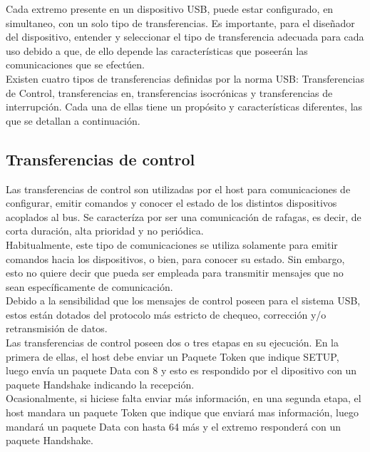 Cada extremo presente en un dispositivo USB, puede estar configurado, en simultaneo, con un solo tipo de transferencias. Es importante, para el diseñador del dispositivo, entender y seleccionar el tipo de transferencia adecuada para cada uso debido a que, de ello depende las características que poseerán las comunicaciones que se efectúen.\\

Existen cuatro tipos de transferencias definidas por la norma USB: Transferencias de Control, transferencias en, transferencias isocrónicas y transferencias de interrupción. Cada una de ellas tiene un propósito y características diferentes, las que se detallan a continuación.\\

\subsection{Transferencias de control}
	Las transferencias de control son utilizadas por el host para comunicaciones de configurar, emitir comandos y conocer el estado de los distintos dispositivos acoplados al bus. Se caracteríza por ser una comunicación de rafagas, es decir, de corta duración, alta prioridad y no periódica.\\
	
	Habitualmente, este tipo de comunicaciones se utiliza solamente para emitir comandos hacia los dispositivos, o bien, para conocer su estado. Sin embargo, esto no quiere decir que pueda ser empleada para transmitir mensajes que no sean específicamente de comunicación.\\
	
	Debido a la sensibilidad que los mensajes de control poseen para el sistema USB, estos están dotados del protocolo más estricto de chequeo, corrección y/o retransmisión de datos.\\
	
	Las transferencias de control poseen dos o tres etapas en su ejecución. En la primera de ellas, el host debe enviar un Paquete Token que indique SETUP, luego envía un paquete Data con \SI{8}{\byte} y esto es respondido por el dipositivo con un paquete Handshake indicando la recepción.\\
	
	Ocasionalmente, si hiciese falta enviar más información, en una segunda etapa, el host mandara un paquete Token que indique que enviará mas información, luego mandará un paquete Data con hasta \SI{64}{\byte} más y el extremo responderá con un paquete Handshake.\\
	

